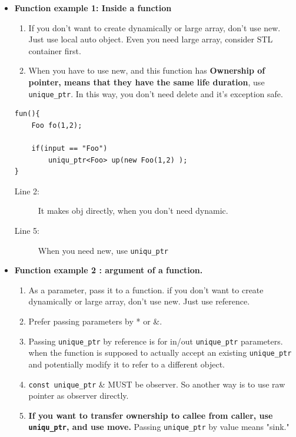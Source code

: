 \documentclass[a4paper,11pt,twoside]{book}
\begin{document}
\begin{itemize}

\item \textbf{Function example 1: Inside a function}
\begin{enumerate}
\item If you don't want to create dynamically or large array, don't use new. Just use local auto object. Even you need large array, consider STL container first.

\item When you have to use new, and this function has \textbf{Ownership of pointer, means that they have the same life duration},  use \texttt{unique\_ptr}. In this way, you don't need delete and it's exception safe.
\end{enumerate}
\begin{lstlisting}
fun(){
	Foo fo(1,2);
	
	if(input == "Foo")
		uniqu_ptr<Foo> up(new Foo(1,2) );
}
\end{lstlisting}
\begin{description}
	\item[Line 2:] It makes obj directly, when you don't need dynamic.
	\item[Line 5:] When you need new, use \texttt{uniqu\_ptr}
\end{description}


\item \textbf{Function example 2 : argument of a function.}
\begin{enumerate}
\item As a parameter, pass it to a function. if you don't want to create dynamically or large array, don't use new. Just use reference.

\item Prefer passing parameters by * or \&.

\item Passing \texttt{unique\_ptr} by reference is for in/out \texttt{unique\_ptr} parameters. when the function is supposed to actually accept an existing \texttt{unique\_ptr} and potentially modify it to refer to a different object. 

\item \texttt{const unique\_ptr} \& MUST be observer. So another way is to use raw pointer as observer directly.

\item \textbf{If you want to transfer ownership to callee from caller, use \texttt{uniqu\_ptr}, and use move.} Passing \texttt{unique\_ptr} by value means "sink."


\end{enumerate}
\end{itemize}
\end{document}
